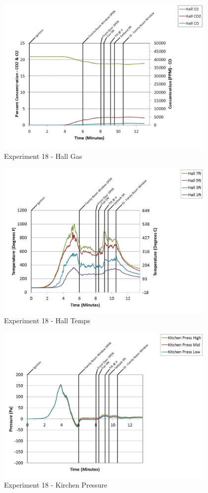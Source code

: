\documentclass{article}
\begin{document}
\begin{appendices}
	\clearpage

	\begin{figure}[h!]
		\centering
		\includegraphics[height=3.05in]{0_Images/Results_Charts/Exp_18_Charts/HallGas.pdf}
		\caption{Experiment 18 - Hall Gas}
	\end{figure}
 

	\begin{figure}[h!]
		\centering
		\includegraphics[height=3.05in]{0_Images/Results_Charts/Exp_18_Charts/HallTemps.pdf}
		\caption{Experiment 18 - Hall Temps}
	\end{figure}
 
	\clearpage

	\begin{figure}[h!]
		\centering
		\includegraphics[height=3.05in]{0_Images/Results_Charts/Exp_18_Charts/KirchenPressure.pdf}
		\caption{Experiment 18 - Kirchen Pressure}
	\end{figure}
 


\end{appendices}
\end{document}
